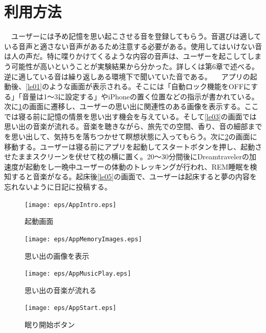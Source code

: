 \section{利用方法}
　ユーザーには予め記憶を思い起こさせる音を登録してもらう。音選びは適している音声と適さない音声があるため注意する必要がある。使用してはいけない音は人の声だ。特に喋りかけてくるような内容の音声は、ユーザーを起こしてしまう可能性が高いということが実験結果から分かった。詳しくは第6章で述べる。逆に適している音は繰り返しある環境下で聞いていた音である。
　アプリの起動後、\ref{le01}のような画面が表示される。そこには「自動ロック機能をOFFにする」「音量は1〜3に設定する」やiPhoneの置く位置などの指示が書かれている。次に\ref{le02}の画面に遷移し、ユーザーの思い出に関連性のある画像を表示する。ここでは寝る前に記憶の情景を思い出す機会を与えている。そして\ref{le03}の画面では思い出の音楽が流れる。音楽を聴きながら、旅先での空間、香り、音の細部までを思い出して、気持ちを落ちつかせて瞑想状態に入ってもらう。次に\ref{le04}の画面に移動する。ユーザーは寝る前にアプリを起動してスタートボタンを押し、起動させたままスクリーンを伏せて枕の横に置く。20〜30分間後にDreamtravelerの加速度が起動をし一晩中ユーザーの体動のトレッキングが行われ、REM睡眠を検知すると音楽がなる。起床後\ref{le05}の画面で、ユーザーは起床すると夢の内容を忘れないように日記に投稿する。

\begin{figure}[htbp]
 \begin{minipage}{0.45\hsize}
  \begin{center}
   \texttt{[image: eps/AppIntro.eps]}
  \end{center}
  \caption{起動画面}
  \label{le01}
 \end{minipage}
 \begin{minipage}{0.45\hsize}
  \begin{center}
   \texttt{[image: eps/AppMemoryImages.eps]}
  \end{center}
  \caption{思い出の画像を表示}
  \label{le02}
 \end{minipage}
\end{figure}

\begin{figure}[htbp]
 \begin{minipage}{0.45\hsize}
  \begin{center}
   \texttt{[image: eps/AppMusicPlay.eps]}
  \end{center}
  \caption{思い出の音楽が流れる}
  \label{le03}
 \end{minipage}
 \begin{minipage}{0.45\hsize}
  \begin{center}
   \texttt{[image: eps/AppStart.eps]}
  \end{center}
  \caption{眠り開始ボタン}
  \label{le04}
 \end{minipage}
\end{figure}

